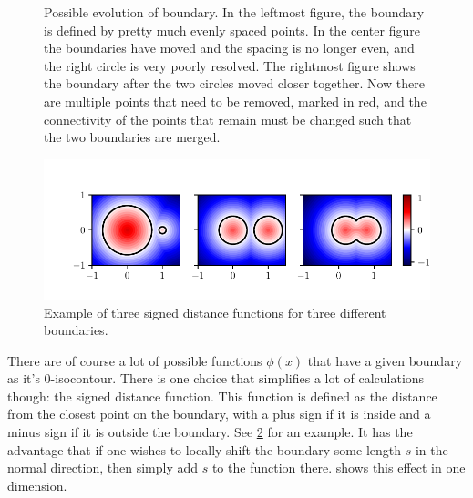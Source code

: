 \begin{figure}[htpb]
	\centering
	
	\caption{%
		Possible evolution of boundary. In the leftmost figure, the
		boundary is defined by pretty much evenly spaced points. In the center figure
		the boundaries have moved and the spacing is no longer even, and the
		right circle is very poorly resolved.
		The rightmost figure shows the boundary after the two circles moved
		closer together. Now there are multiple points that need to be removed,
		marked in red, and the connectivity of the points that remain must be
		changed such that the two boundaries are merged.
	}
	\label{fig:direct_troubles}
\end{figure}
\begin{figure}[htpb]
	\centering
	\includegraphics{chapters/methods/signed_dist_example.pdf}
	\caption{%
		Example of three signed distance functions for three different
		boundaries.
	}
	\label{fig:signed_dist_example}
\end{figure}

There are of course a lot of possible functions $\phi(x)$ that have a given
boundary as it's 0-isocontour.
There is one choice that simplifies a lot of calculations though: the signed
distance function.
This function is defined as the distance from the closest point on the boundary,
with a plus sign if it is inside and a minus sign if it is outside the boundary.
See \cref{fig:signed_dist_example} for an example.
It has the advantage that if one wishes to locally shift the boundary some
length $s$ in the normal direction, then simply add $s$ to the function there.
 shows this effect in one dimension.

